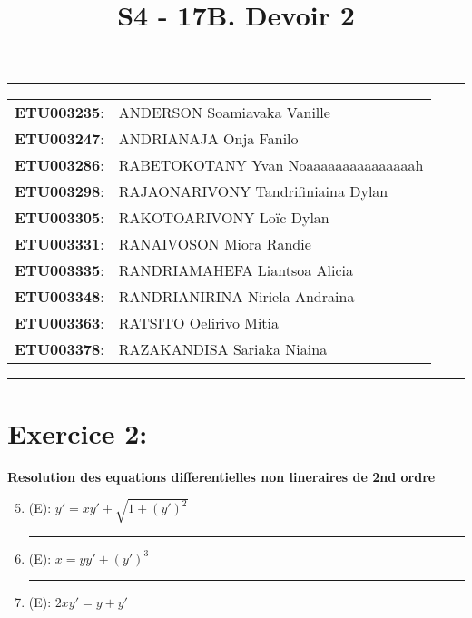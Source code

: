 \documentclass[a4paper,12pt]{article}
\begin{document}
	
\title{\textbf{S4 - 17B. Devoir 2}}
\date{}
\maketitle

\hrule
\vspace{1em}

\begin{tabular}{rl}
	\textbf{ETU003235}: & ANDERSON Soamiavaka Vanille \\
	\textbf{ETU003247}: & ANDRIANAJA Onja Fanilo \\
	\textbf{ETU003286}: & RABETOKOTANY Yvan Noaaaaaaaaaaaaaaah \\
	\textbf{ETU003298}: & RAJAONARIVONY Tandrifiniaina Dylan \\
	\textbf{ETU003305}: & RAKOTOARIVONY Loïc Dylan \\
	\textbf{ETU003331}: & RANAIVOSON Miora Randie \\
	\textbf{ETU003335}: & RANDRIAMAHEFA Liantsoa Alicia \\
	\textbf{ETU003348}: & RANDRIANIRINA Niriela Andraina \\
	\textbf{ETU003363}: & RATSITO Oelirivo Mitia \\
	\textbf{ETU003378}: & RAZAKANDISA Sariaka Niaina \\
\end{tabular}

\vspace{1em}
\hrule

\newpage
\section*{Exercice 2:}
\textbf{Resolution des equations differentielles non lineraires de 2nd ordre}

\begin{enumerate}
	\setcounter{enumi}{4}
	\vspace{1cm}	
	\item (E): $y' = xy' + \sqrt{1+(y')^2}$ \\
	
	
	\vspace{1cm}
	\hrule
	\vspace{1cm}

	\item (E): $x = yy' + (y')^3$ \\
	
	
	\vspace{1cm}
	\hrule
	\vspace{1cm}

	\item (E): $2xy' = y + y'$ \\
	
	\vspace{1cm}
	

\end{enumerate}
\end{document}
